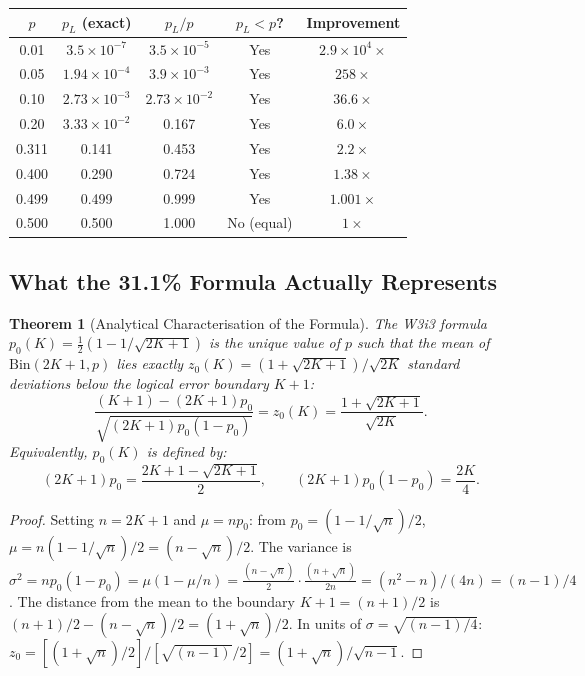 \documentclass[11pt]{article}
\newtheorem{theorem}{Theorem}[section]
\theoremstyle{definition}
\theoremstyle{remark}
\begin{document}
\begin{center}
\begin{tabular}{ccccc}
\toprule
$p$ & $p_L$ (exact) & $p_L/p$ & $p_L < p$? & Improvement \\
\midrule
0.01 & $3.5\times10^{-7}$ & $3.5\times10^{-5}$ & Yes & $2.9\times10^{4}\times$ \\
0.05 & $1.94\times10^{-4}$ & $3.9\times10^{-3}$ & Yes & $258\times$ \\
0.10 & $2.73\times10^{-3}$ & $2.73\times10^{-2}$ & Yes & $36.6\times$ \\
0.20 & $3.33\times10^{-2}$ & 0.167 & Yes & $6.0\times$ \\
0.311 & 0.141 & 0.453 & Yes & $2.2\times$ \\
0.400 & 0.290 & 0.724 & Yes & $1.38\times$ \\
0.499 & 0.499 & 0.999 & Yes & $1.001\times$ \\
0.500 & 0.500 & 1.000 & No (equal) & $1\times$ \\
\bottomrule
\end{tabular}
\end{center}

\subsection{What the 31.1\% Formula Actually Represents}
\label{sec:formula-interpretation}

\begin{theorem}[Analytical Characterisation of the Formula]
\label{thm:formula-meaning}
The W3i3 formula $p_0(K) = \tfrac{1}{2}(1 - 1/\sqrt{2K+1})$ is the unique value
of $p$ such that the mean of $\mathrm{Bin}(2K+1, p)$ lies exactly
$z_0(K) = (1+\sqrt{2K+1})/\sqrt{2K}$ standard deviations below the logical
error boundary $K+1$:
\begin{equation}
  \frac{(K+1) - (2K+1)p_0}{\sqrt{(2K+1)p_0(1-p_0)}} = z_0(K)
  = \frac{1+\sqrt{2K+1}}{\sqrt{2K}}.
  \label{eq:z0-definition}
\end{equation}
Equivalently, $p_0(K)$ is defined by:
\begin{equation}
  (2K+1)p_0 = \frac{2K+1 - \sqrt{2K+1}}{2}, \qquad
  (2K+1)p_0(1-p_0) = \frac{2K}{4}.
  \label{eq:p0-properties}
\end{equation}
\end{theorem}

\begin{proof}
Setting $n = 2K+1$ and $\mu = np_0$: from $p_0 = (1 - 1/\sqrt{n})/2$,
$\mu = n(1-1/\sqrt{n})/2 = (n - \sqrt{n})/2$.  The variance is
$\sigma^2 = np_0(1-p_0) = \mu(1-\mu/n)= \tfrac{(n-\sqrt{n})}{2}\cdot\tfrac{(n+\sqrt{n})}{2n}
= (n^2-n)/(4n) = (n-1)/4$.
The distance from the mean to the boundary $K+1 = (n+1)/2$ is
$(n+1)/2 - (n-\sqrt{n})/2 = (1+\sqrt{n})/2$.
In units of $\sigma = \sqrt{(n-1)/4}$:
$z_0 = [(1+\sqrt{n})/2]/[\sqrt{(n-1)}/2] = (1+\sqrt{n})/\sqrt{n-1}$.
\end{proof}
\end{document}
